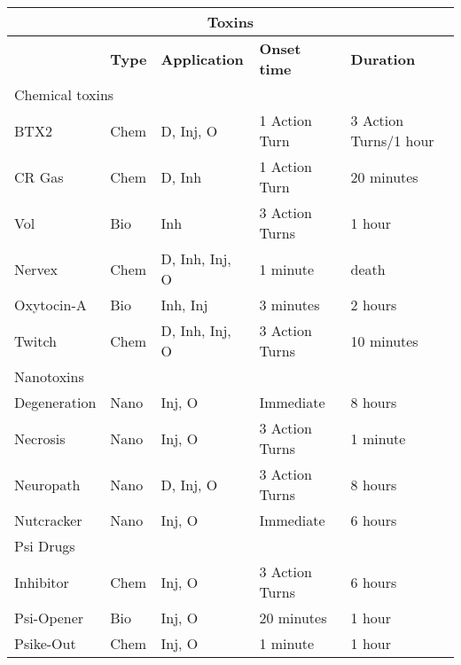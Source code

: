 \begin{table} 

\begin{tabular}{|l|l|l|l|l|} \hline

\multicolumn{5}{|c|}{\textbf{Toxins}} \\ \hline

&\textbf{Type}	&\textbf{Application}	&\textbf{Onset time}	&\textbf{Duration} \\ \hline

\multicolumn{5}{|l|}{Chemical toxins} \\ \hline

BTX2	&Chem	&D, Inj, O	&1 Action Turn	&3 Action Turns/1 hour \\ \hline

CR Gas	&Chem	&D, Inh	&1 Action Turn	&20 minutes \\ \hline

Vol	&Bio	&Inh	&3 Action Turns	&1 hour \\ \hline

Nervex	&Chem	&D, Inh, Inj, O	&1 minute	&death \\ \hline

Oxytocin-A	&Bio	&Inh, Inj	&3 minutes	&2 hours \\ \hline

Twitch	&Chem	&D, Inh, Inj, O	&3 Action Turns	&10 minutes \\ \hline

\multicolumn{5}{|l|}{Nanotoxins} \\ \hline

Degeneration	&Nano	&Inj, O	&Immediate	&8 hours \\ \hline

Necrosis	&Nano	&Inj, O	&3 Action Turns	&1 minute \\ \hline

Neuropath	&Nano	&D, Inj, O	&3 Action Turns	&8 hours \\ \hline

Nutcracker	&Nano	&Inj, O	&Immediate	&6 hours \\ \hline

\multicolumn{5}{|l|}{Psi Drugs} \\ \hline

Inhibitor	&Chem	&Inj, O	&3 Action Turns	&6 hours \\ \hline

Psi-Opener	&Bio	&Inj, O	&20 minutes	&1 hour \\ \hline

Psike-Out	&Chem	&Inj, O	&1 minute	&1 hour \\ \hline

\end{tabular} \label{tab:Toxins} \end{table} 



